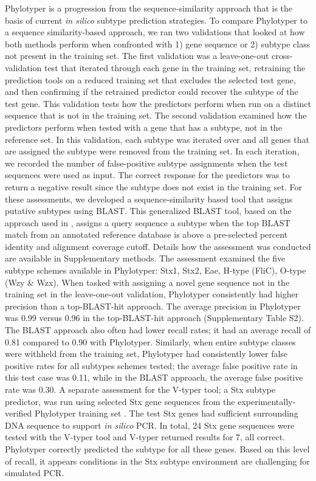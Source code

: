 \documentclass{bioinfo}
\begin{document}
Phylotyper is a progression from the sequence-similarity approach that is the basis of current \textit{in silico} subtype prediction strategies.
To compare Phylotyper to a sequence similarity-based approach, we ran two validations that looked at how both methods perform when confronted with 1) gene sequence or 2) subtype class not present in the training set.
The first validation was a leave-one-out cross-validation test that iterated through each gene in the training set, retraining the prediction tools on a reduced training set that excludes the selected test gene, and then confirming if the retrained predictor could recover the subtype of the test gene.
This validation tests how the predictors perform when run on a distinct sequence that is not in the training set.
The second validation examined how the predictors perform when tested with a gene that has a subtype, not in the reference set.
In this validation, each subtype was iterated over and all genes that are assigned the subtype were removed from the training set.
In each iteration, we recorded the number of false-positive subtype assignments when the test sequences were used as input.
The correct response for the predictors was to return a negative result since the subtype does not exist in the training set.
For these assessments, we developed a sequence-similarity based tool that assigns putative subtypes using BLAST.
This generalized BLAST tool, based on the approach used in \citep{Joensen2015}, assigns a query sequence a subtype when the top BLAST match from an annotated reference database is above a pre-selected percent identity and alignment coverage cutoff.
Details how the assessment was conducted are available in Supplementary methods.
The assessment examined the five subtype schemes available in Phylotyper: Stx1, Stx2, Eae, H-type (FliC), O-type (Wzy \& Wzx).
When tasked with assigning a novel gene sequence not in the training set in the leave-one-out validation, Phylotyper consistently had higher precision than a top-BLAST-hit approach.
The average precision in Phylotyper was 0.99 versus 0.96 in the top-BLAST-hit approach (Supplementary Table S2).
The BLAST approach also often had lower recall rates; it had an average recall of 0.81 compared to 0.90 with Phylotyper.
Similarly, when entire subtype classes were withheld from the training set, Phylotyper had consistently lower false positive rates for all subtypes schemes tested; the average false positive rate in this test case was 0.11, while in the BLAST approach, the average false positive rate was 0.30.
A separate assessment for the V-typer tool; a Stx subtype predictor, was run using selected Stx gene sequences from the experimentally-verified Phylotyper training set \citep{CARRILLO2016}.
The test Stx genes had sufficient surrounding DNA sequence to support \textit{in silico} PCR.
In total, 24 Stx gene sequences were tested with the V-typer tool and V-typer returned results for 7, all correct.
Phylotyper correctly predicted the subtype for all these genes.
Based on this level of recall, it appears conditions in the Stx subtype environment are challenging for simulated PCR.
\end{document}
